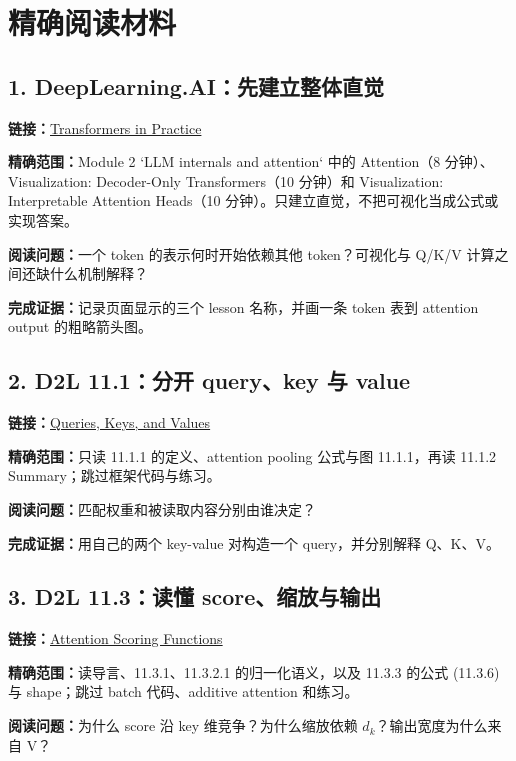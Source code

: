 \documentclass[11pt,a4paper]{article}
\begin{document}
\section{精确阅读材料}

\subsection{1. DeepLearning.AI：先建立整体直觉}
\textbf{链接：}\href{https://www.deeplearning.ai/courses/transformers-in-practice/}{Transformers in Practice}

\textbf{精确范围：}Module 2 `LLM internals and attention` 中的 Attention（8 分钟）、Visualization: Decoder-Only Transformers（10 分钟）和 Visualization: Interpretable Attention Heads（10 分钟）。只建立直觉，不把可视化当成公式或实现答案。

\textbf{阅读问题：}一个 token 的表示何时开始依赖其他 token？可视化与 Q/K/V 计算之间还缺什么机制解释？

\textbf{完成证据：}记录页面显示的三个 lesson 名称，并画一条 token 表到 attention output 的粗略箭头图。

\subsection{2. D2L 11.1：分开 query、key 与 value}
\textbf{链接：}\href{https://d2l.ai/chapter_attention-mechanisms-and-transformers/queries-keys-values.html}{Queries, Keys, and Values}

\textbf{精确范围：}只读 11.1.1 的定义、attention pooling 公式与图 11.1.1，再读 11.1.2 Summary；跳过框架代码与练习。

\textbf{阅读问题：}匹配权重和被读取内容分别由谁决定？

\textbf{完成证据：}用自己的两个 key-value 对构造一个 query，并分别解释 Q、K、V。

\subsection{3. D2L 11.3：读懂 score、缩放与输出}
\textbf{链接：}\href{https://d2l.ai/chapter_attention-mechanisms-and-transformers/attention-scoring-functions.html}{Attention Scoring Functions}

\textbf{精确范围：}读导言、11.3.1、11.3.2.1 的归一化语义，以及 11.3.3 的公式 (11.3.6) 与 shape；跳过 batch 代码、additive attention 和练习。

\textbf{阅读问题：}为什么 score 沿 key 维竞争？为什么缩放依赖 $d_k$？输出宽度为什么来自 V？
\end{document}
